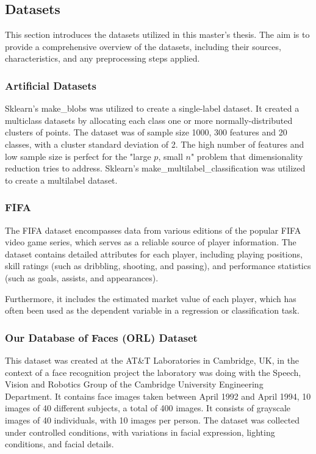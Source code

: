 \subsection{Datasets}
This section introduces the datasets utilized in this master's thesis. The aim is to provide a comprehensive overview of the datasets, including their sources, characteristics, and any preprocessing steps applied.

\subsubsection{Artificial Datasets}\label{section:artificial-dataset}
Sklearn's make\_blobs was utilized to create a single-label dataset. It created a multiclass datasets by allocating each class one or more normally-distributed clusters of points. The dataset was of sample size 1000, 300 features and 20 classes, with a cluster standard deviation of 2. The high number of features and low sample size is perfect for the "large $p$, small $n$" problem that dimensionality reduction tries to address.
Sklearn's make\_multilabel\_classification was utilized to create a multilabel dataset.

\subsubsection{FIFA}\label{section:fifa-dataset}
The FIFA dataset encompasses data from various editions of the popular FIFA video game series, which serves as a reliable source of player information. The dataset contains detailed attributes for each player, including playing positions, skill ratings (such as dribbling, shooting, and passing), and performance statistics (such as goals, assists, and appearances).

Furthermore, it includes the estimated market value of each player, which has often been used as the dependent variable in a regression or classification task.

\subsubsection{Our Database of Faces (ORL) Dataset}\label{section:orl-dataset}
This dataset \cite{orl_dataset} was created at the AT\&T Laboratories in Cambridge, UK, in the context of a face recognition project the laboratory was doing with the Speech, Vision and Robotics Group of the Cambridge University Engineering Department. It contains face images taken between April 1992 and April 1994, 10 images of 40 different subjects, a total of 400 images. It consists of grayscale images of 40 individuals, with 10 images per person. The dataset was collected under controlled conditions, with variations in facial expression, lighting conditions, and facial details.

